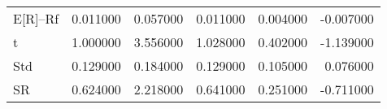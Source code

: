\begin{tabular}{lrrrrr}
\toprule
\midrule
E[R]--Rf & 0.011000 & 0.057000 & 0.011000 & 0.004000 & -0.007000 \\
t & 1.000000 & 3.556000 & 1.028000 & 0.402000 & -1.139000 \\
Std & 0.129000 & 0.184000 & 0.129000 & 0.105000 & 0.076000 \\
SR & 0.624000 & 2.218000 & 0.641000 & 0.251000 & -0.711000 \\
\bottomrule
\end{tabular}
